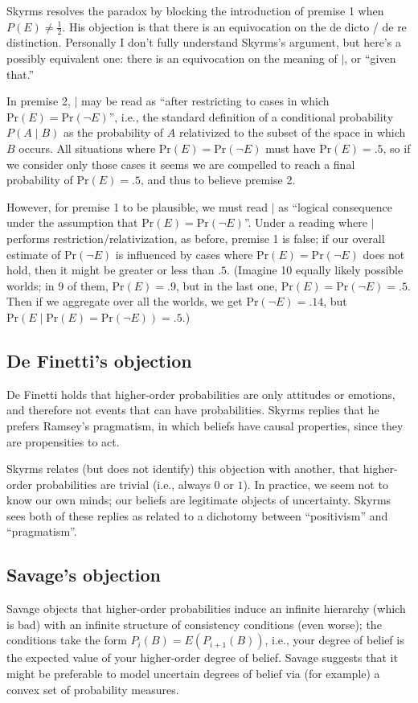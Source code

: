 \documentclass[letterpaper,12pt]{article}
\newcommand{\Prob}{\text{Pr}}
\begin{document}
Skyrms resolves the paradox by blocking the introduction of premise 1 when $P(E) \not = \frac{1}{2}$. His objection is that there is an equivocation on the de dicto / de re distinction. Personally I don't fully understand Skyrms's argument, but here's a possibly equivalent one: there is an equivocation on the meaning of $\mid$, or ``given that.''

In premise 2, $\mid$ may be read as ``after restricting to cases in which $\text{Pr}(E) = \text{Pr}(\neg E)$'', i.e., the standard definition of a conditional probability $P(A \mid B)$ as the probability of $A$ relativized to the subset of the space in which $B$ occurs. All situations where $\text{Pr}(E) = \text{Pr}(\neg E)$ must have $\text{Pr}(E) = .5$, so if we consider only those cases it seems we are compelled to reach a final probability of $\text{Pr}(E) = .5$, and thus to believe premise 2.

However, for premise 1 to be plausible, we must read $\mid$ as ``logical consequence under the assumption that $\text{Pr}(E) = \text{Pr}(\neg E)$''. Under a reading where $\mid$ performs restriction/relativization, as before, premise 1 is false; if our overall estimate of $\text{Pr}(\neg E)$ is influenced by cases where $\text{Pr}(E) = \text{Pr}(\neg E)$ does not hold, then it might be greater or less than $.5$. (Imagine 10 equally likely possible worlds; in 9 of them, $\Prob(E) = .9$, but in the last one, $\Prob(E) = \Prob(\neg E) = .5$. Then if we aggregate over all the worlds, we get $\Prob(\neg E) = .14$, but $\Prob(E \mid \Prob(E) = \Prob(\neg E)) = .5$.)

\subsection{De Finetti's objection}
De Finetti holds that higher-order probabilities are only attitudes or emotions, and therefore not events that can have probabilities. Skyrms replies that he prefers Ramsey's pragmatism, in which beliefs have causal properties, since they are propensities to act.

Skyrms relates (but does not identify) this objection with another, that higher-order probabilities are trivial (i.e., always $0$ or $1$). In practice, we seem not to know our own minds; our beliefs are legitimate objects of uncertainty. Skyrms sees both of these replies as related to a dichotomy between ``positivism'' and ``pragmatism''.

\subsection{Savage's objection}
Savage objects that higher-order probabilities induce an infinite hierarchy (which is bad) with an infinite structure of consistency conditions (even worse); the conditions take the form $P_i(B) = E(P_{i+1}(B))$, i.e., your degree of belief is the expected value of your higher-order degree of belief. Savage suggests that it might be preferable to model uncertain degrees of belief via (for example) a convex set of probability measures.
\end{document}

